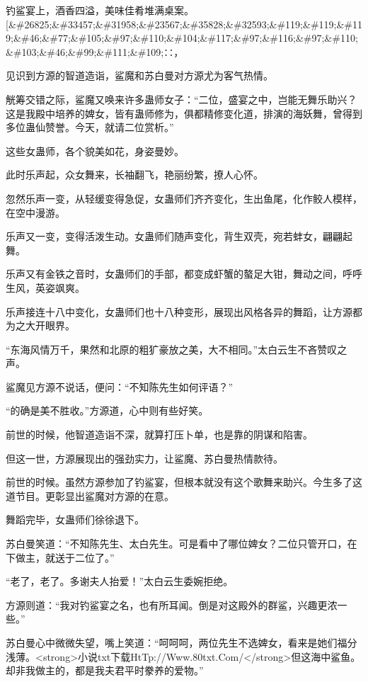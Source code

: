 
\begin{this_body}

钓鲨宴上，酒香四溢，美味佳肴堆满桌案。[\&\#26825;\&\#33457;\&\#31958;\&\#23567;\&\#35828;\&\#32593;\&\#119;\&\#119;\&\#119;\&\#46;\&\#77;\&\#105;\&\#97;\&\#110;\&\#104;\&\#117;\&\#97;\&\#116;\&\#97;\&\#110;\&\#103;\&\#46;\&\#99;\&\#111;\&\#109;∷，

见识到方源的智道造诣，鲨魔和苏白曼对方源尤为客气热情。

觥筹交错之际，鲨魔又唤来许多蛊师女子：“二位，盛宴之中，岂能无舞乐助兴？这是我殿中培养的婢女，皆有蛊师修为，俱都精修变化道，排演的海妖舞，曾得到多位蛊仙赞誉。今天，就请二位赏析。”

这些女蛊师，各个貌美如花，身姿曼妙。

此时乐声起，众女舞来，长袖翻飞，艳丽纷繁，撩人心怀。

忽然乐声一变，从轻缓变得急促，女蛊师们齐齐变化，生出鱼尾，化作鲛人模样，在空中漫游。

乐声又一变，变得活泼生动。女蛊师们随声变化，背生双壳，宛若蚌女，翩翩起舞。

乐声又有金铁之音时，女蛊师们的手部，都变成虾蟹的螯足大钳，舞动之间，呼呼生风，英姿飒爽。

乐声接连十八中变化，女蛊师们也十八种变形，展现出风格各异的舞蹈，让方源都为之大开眼界。

“东海风情万千，果然和北原的粗犷豪放之美，大不相同。”太白云生不吝赞叹之声。

鲨魔见方源不说话，便问：“不知陈先生如何评语？”

“的确是美不胜收。”方源道，心中则有些好笑。

前世的时候，他智道造诣不深，就算打压卜单，也是靠的阴谋和陷害。

但这一世，方源展现出的强劲实力，让鲨魔、苏白曼热情款待。

前世的时候。虽然方源参加了钓鲨宴，但根本就没有这个歌舞来助兴。今生多了这道节目。更彰显出鲨魔对方源的在意。

舞蹈完毕，女蛊师们徐徐退下。

苏白曼笑道：“不知陈先生、太白先生。可是看中了哪位婢女？二位只管开口，在下做主，就送于二位了。”

“老了，老了。多谢夫人抬爱！”太白云生委婉拒绝。

方源则道：“我对钓鲨宴之名，也有所耳闻。倒是对这殿外的群鲨，兴趣更浓一些。”

苏白曼心中微微失望，嘴上笑道：“呵呵呵，两位先生不选婢女，看来是她们福分浅薄。<strong>小说txt下载HtTp://Www.80txt.Com/</strong>但这海中鲨鱼。却非我做主的，都是我夫君平时豢养的爱物。”


\end{this_body}
